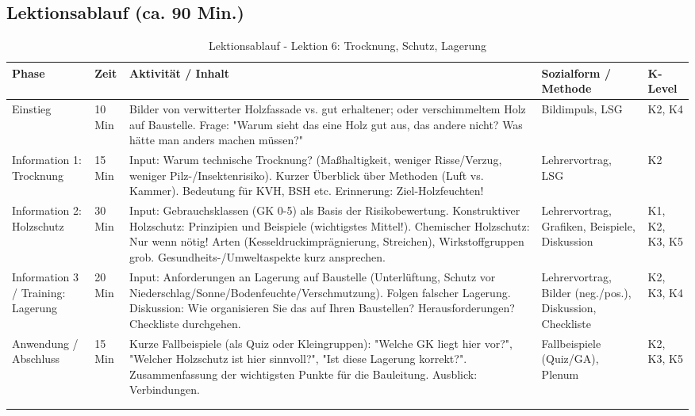 \documentclass[12pt, a4paper]{article}
\begin{document}
\subsection{Lektionsablauf (ca. 90 Min.)}
\begin{longtable}{|p{}|p{}|>{\raggedright\arraybackslash}p{}|p{}|p{}|}
    \hline
    \textbf{Phase} & \textbf{Zeit} & \textbf{Aktivität / Inhalt} & \textbf{Sozialform / Methode} & \textbf{K-Level} \\
    \hline
    \endhead

    Einstieg & 10 Min & Bilder von verwitterter Holzfassade vs. gut erhaltener; oder verschimmeltem Holz auf Baustelle. Frage: "Warum sieht das eine Holz gut aus, das andere nicht? Was hätte man anders machen müssen?" & Bildimpuls, LSG & K2, K4 \\
    \hline
    Information 1: Trocknung & 15 Min & Input: Warum technische Trocknung? (Maßhaltigkeit, weniger Risse/Verzug, weniger Pilz-/Insektenrisiko). Kurzer Überblick über Methoden (Luft vs. Kammer). Bedeutung für KVH, BSH etc. Erinnerung: Ziel-Holzfeuchten! & Lehrervortrag, LSG & K2 \\
    \hline
    Information 2: Holzschutz & 30 Min & Input: Gebrauchsklassen (GK 0-5) als Basis der Risikobewertung. Konstruktiver Holzschutz: Prinzipien und Beispiele (wichtigstes Mittel!). Chemischer Holzschutz: Nur wenn nötig! Arten (Kesseldruckimprägnierung, Streichen), Wirkstoffgruppen grob. Gesundheits-/Umweltaspekte kurz ansprechen. & Lehrervortrag, Grafiken, Beispiele, Diskussion & K1, K2, K3, K5 \\
    \hline
    Information 3 / Training: Lagerung & 20 Min & Input: Anforderungen an Lagerung auf Baustelle (Unterlüftung, Schutz vor Niederschlag/Sonne/Bodenfeuchte/Verschmutzung). Folgen falscher Lagerung. Diskussion: Wie organisieren Sie das auf Ihren Baustellen? Herausforderungen? Checkliste durchgehen. & Lehrervortrag, Bilder (neg./pos.), Diskussion, Checkliste & K2, K3, K4 \\
    \hline
    Anwendung / Abschluss & 15 Min & Kurze Fallbeispiele (als Quiz oder Kleingruppen): "Welche GK liegt hier vor?", "Welcher Holzschutz ist hier sinnvoll?", "Ist diese Lagerung korrekt?". Zusammenfassung der wichtigsten Punkte für die Bauleitung. Ausblick: Verbindungen. & Fallbeispiele (Quiz/GA), Plenum & K2, K3, K5 \\
    \hline
    \caption{Lektionsablauf - Lektion 6: Trocknung, Schutz, Lagerung} \\
    \label{tab:lektion6-bf}
\end{longtable}
\end{document}
